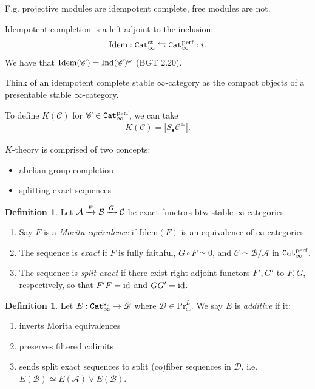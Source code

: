 \documentclass[12pt]{amsart}
\theoremstyle{definition}
\newtheorem{definition}[theorem]{Definition}
\providecommand{\st}{\text{st}}
\providecommand{\Pr}{\text{Pr}}
\providecommand{\Idem}{\text{Idem}}
\begin{document}
F.g. projective modules are idempotent complete, free modules are not. 

Idempotent completion is a left adjoint to the inclusion:
\begin{align*}
    \Idem: \Cat_\infty^\st \leftrightarrows \Cat_\infty^\perf : i.
\end{align*}
We have that $\Idem(\mathscr{C}) = \Ind(\mathscr{C})^\omega$ (BGT 2.20).

Think of an idempotent complete stable $\infty$-category as the compact objects of a presentable stable $\infty$-category.

To define $K(\mathscr{C})$ for $\mathscr{C} \in \texttt{Cat}_\infty^{\text{perf}}$, we can take
\begin{align*}
    K(\mathscr{C}) = \left| S_\bullet \mathscr{C}^\simeq \right|.
\end{align*}

$K$-theory is comprised of two concepts:
\begin{itemize}
    \item abelian group completion
    \item splitting exact sequences
\end{itemize}

\begin{definition} Let $\mathcal{A} \xrightarrow{F} \mathcal{B} \xrightarrow{G} \mathcal{C}$ be exact functors btw stable $\infty$-categories.
\begin{enumerate}
    \item Say $F$ is a \textit{Morita equivalence} if $\Idem(F)$ is an equivalence of $\infty$-categories
    \item The sequence is \textit{exact} if $F$ is fully faithful, $G\circ F \simeq 0$, and $\mathcal{C} \simeq \mathcal{B}/\mathcal{A}$ in $\texttt{Cat}_\infty^{\text{perf}}$.
    \item The sequence is \textit{split exact} if there exist right adjoint functors $F',G'$ to $F,G$, respectively, so that $F'F = \text{id}$ and $GG' = \text{id}$.
\end{enumerate}
\end{definition}

\begin{definition} Let $E: \Cat_\infty^\st \to \mathscr{D}$ where $\mathscr{D}\in \Pr^L_\st$. We say $E$ is \textit{additive} if it:
\begin{enumerate}
    \item inverts Morita equivalences
    \item preserves filtered colimits
    \item sends split exact sequences to split (co)fiber sequences in $\mathscr{D}$, i.e. $E(\mathcal{B})\simeq E(\mathcal{A})\vee E(\mathcal{B})$.
\end{enumerate}
\end{definition}
\end{document}
